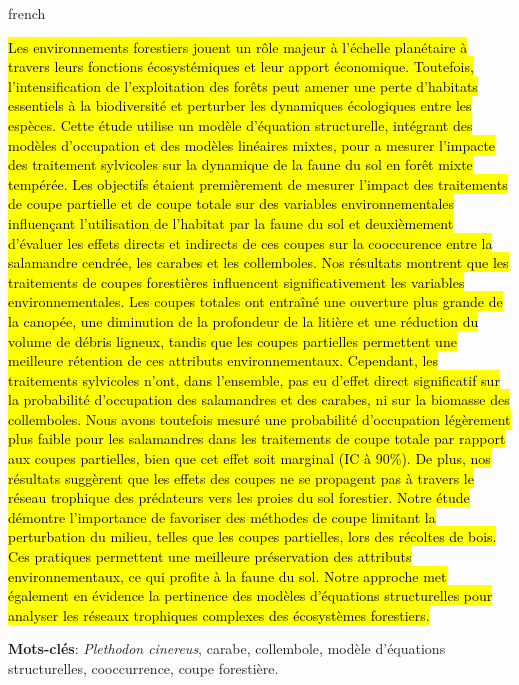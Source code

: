\begin{otherlanguage*}{french}

\hl{Les environnements forestiers jouent un rôle majeur à l’échelle planétaire à travers leurs fonctions écosystémiques et leur apport économique. 
Toutefois, l'intensification de l'exploitation des forêts peut amener une perte d'habitats essentiels à la biodiversité et perturber les dynamiques écologiques entre les espèces. 
Cette étude utilise un modèle d'équation structurelle, intégrant des modèles d’occupation et des modèles linéaires mixtes, pour a mesurer l'impacte des traitement sylvicoles sur la dynamique de la faune du sol en forêt mixte tempérée. 
Les objectifs étaient premièrement de mesurer l’impact des traitements de coupe partielle et de coupe totale sur des variables environnementales influençant l’utilisation de l’habitat par la faune du sol 
et deuxièmement d’évaluer les effets directs et indirects de ces coupes sur la cooccurence entre la salamandre cendrée, les carabes et les collemboles. 
Nos résultats montrent que les traitements de coupes forestières influencent significativement les variables environnementales. 
Les coupes totales ont entraîné une ouverture plus grande de la canopée, une diminution de la profondeur de la litière et une réduction du volume de débris ligneux, 
tandis que les coupes partielles permettent une meilleure rétention de ces attributs environnementaux. 
Cependant, les traitements sylvicoles n’ont, dans l’ensemble, pas eu d’effet direct significatif sur la probabilité d’occupation des salamandres et des carabes, ni sur la biomasse des collemboles. 
Nous avons toutefois mesuré une probabilité d’occupation légèrement plus faible pour les salamandres dans les traitements de coupe totale par rapport aux coupes partielles, bien que cet effet soit marginal (IC à 90\%). 
De plus, nos résultats suggèrent que les effets des coupes ne se propagent pas à travers le réseau trophique des prédateurs vers les proies du sol forestier. 
Notre étude démontre l'importance de favoriser des méthodes de coupe limitant la perturbation du milieu, telles que les coupes partielles, lors des récoltes de bois. 
Ces pratiques permettent une meilleure préservation des attributs environnementaux, ce qui profite à la faune du sol. 
Notre approche met également en évidence la pertinence des modèles d’équations structurelles pour analyser les réseaux trophiques complexes des écosystèmes forestiers. }

\textbf{Mots-clés}: \textit{Plethodon cinereus}, carabe, collembole, modèle d'équations structurelles, cooccurrence, coupe forestière.
\end{otherlanguage*}


